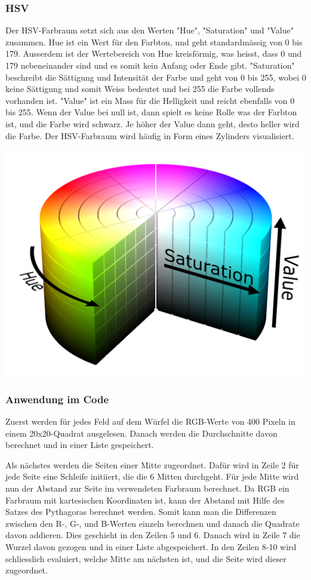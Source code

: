 \documentclass[a4paper, 12pt]{article}
\begin{document}
\subsubsection{HSV}
Der HSV-Farbraum setzt sich aus den Werten "Hue", "Saturation" und "Value" zusammen. Hue ist ein Wert für den Farbton, und geht standardmässig von 0 bis 179. Ausserdem ist der Wertebereich von Hue kreisförmig, was heisst, dass 0 und 179 nebeneinander sind und es somit kein Anfang oder Ende gibt. "Saturation" beschreibt die Sättigung und Intensität der Farbe und geht von 0 bis 255, wobei 0 keine Sättigung und somit Weiss bedeutet und bei 255 die Farbe vollends vorhanden ist. "Value" ist ein Mass für die Helligkeit und reicht ebenfalls von 0 bis 255. Wenn der Value bei null ist, dann spielt es keine Rolle was der Farbton ist, und die Farbe wird schwarz. Je höher der Value dann geht, desto heller wird die Farbe. Der HSV-Farbraum wird häufig in Form eines Zylinders visualisiert.

\includegraphics[scale=0.07]{HSV_Zylinder} 
\subsubsection{Anwendung im Code}
Zuerst werden für jedes Feld auf dem Würfel die RGB-Werte von 400 Pixeln in einem 20x20-Quadrat ausgelesen. Danach werden die Durchschnitte davon berechnet und in einer Liste gespeichert.

Als nächstes werden die Seiten einer Mitte zugeordnet. Dafür wird in Zeile 2 für jede Seite eine Schleife initiiert, die die 6 Mitten durchgeht. Für jede Mitte wird nun der Abstand zur Seite im verwendeten Farbraum berechnet. Da RGB ein Farbraum mit kartesischen Koordinaten ist, kann der Abstand mit Hilfe des Satzes des Pythagoras berechnet werden. Somit kann man die Differenzen zwischen den R-, G-, und B-Werten einzeln berechnen und danach die Quadrate davon addieren. Dies geschieht in den Zeilen 5 und 6. Danach wird in Zeile 7 die Wurzel davon gezogen und in einer Liste abgespeichert. In den Zeilen 8-10 wird schliesslich evaluiert, welche Mitte am nächsten ist, und die Seite wird dieser zugeordnet. 

\end{document}
